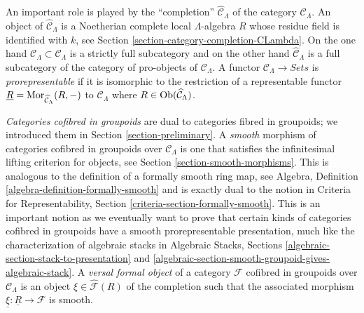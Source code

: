 \medskip \noindent
An important role is played by the ``completion''
$\widehat{\mathcal{C}}_\Lambda$ of the category $\mathcal{C}_\Lambda$.
An object of $\widehat{\mathcal{C}}_\Lambda$ is a Noetherian complete
local $\Lambda$-algebra $R$ whose residue field is identified with $k$, see
Section \ref{section-category-completion-CLambda}.
On the one hand $\mathcal{C}_\Lambda \subset \widehat{\mathcal{C}}_\Lambda$
is a strictly full subcategory and on the other hand
$\widehat{\mathcal{C}}_\Lambda$ is a full subcategory of the category
of pro-objects of $\mathcal{C}_\Lambda$. A functor
$\mathcal{C}_\Lambda \to \textit{Sets}$ is {\it prorepresentable}
if it is isomorphic to the restriction of a representable functor
$\underline{R} = \mathop{\rm Mor}\nolimits_{\widehat{\mathcal{C}}_\Lambda}(R, -)$
to $\mathcal{C}_\Lambda$ where
$R \in \mathop{\rm Ob}\nolimits(\widehat{\mathcal{C}}_\Lambda)$.

\medskip\noindent
{\it Categories cofibred in groupoids} are dual to categories fibred in
groupoids; we introduced them in Section \ref{section-preliminary}.
A {\it smooth} morphism of categories cofibred in groupoids over
$\mathcal{C}_\Lambda$ is one that satisfies the infinitesimal lifting
criterion for objects, see
Section \ref{section-smooth-morphisms}.
This is analogous to the definition of a formally smooth ring map, see
Algebra, Definition \ref{algebra-definition-formally-smooth}
and is exactly dual to the notion in
Criteria for Representability, Section \ref{criteria-section-formally-smooth}.
This is an important notion as we eventually want to prove that certain
kinds of categories cofibred in groupoids have a smooth prorepresentable
presentation, much like the characterization of algebraic stacks in
Algebraic Stacks, Sections \ref{algebraic-section-stack-to-presentation} and
\ref{algebraic-section-smooth-groupoid-gives-algebraic-stack}.
A {\it versal formal object} of a category $\mathcal{F}$ cofibred
in groupoids over $\mathcal{C}_\Lambda$ is an object
$\xi \in \widehat{\mathcal{F}}(R)$ of the completion such that the
associated morphism $\underline{\xi} : \underline{R} \to \mathcal{F}$
is smooth.

